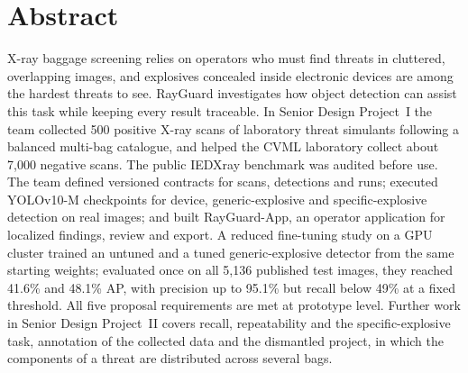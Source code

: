 \documentclass[12pt,a4paper,oneside]{report}
\begin{document}
\chapter*{Abstract}
X-ray baggage screening relies on operators who must find threats in cluttered,
overlapping images, and explosives concealed inside electronic devices are among
the hardest threats to see. RayGuard investigates how object detection can assist
this task while keeping every result traceable. In Senior Design Project~I the
team collected 500 positive X-ray scans of laboratory threat simulants following a
balanced multi-bag catalogue, and helped the CVML laboratory collect about 7,000
negative scans. The public IEDXray benchmark was audited before use. The team defined versioned
contracts for scans, detections and runs; executed YOLOv10-M checkpoints for
device, generic-explosive and specific-explosive detection on real images; and
built RayGuard-App, an operator application for localized findings, review and export. A reduced fine-tuning study on a GPU cluster trained
an untuned and a tuned generic-explosive detector from the same starting weights;
evaluated once on all 5,136 published test images, they reached 41.6\% and 48.1\%
AP, with precision up to 95.1\% but recall below 49\% at a fixed threshold.
All five proposal requirements are met at prototype level. Further work in Senior
Design Project~II covers recall, repeatability and the specific-explosive task,
annotation of the collected data and the dismantled project, in which the
components of a threat are distributed across several bags.
\tableofcontents
\listoffigures
\listoftables
\end{document}

